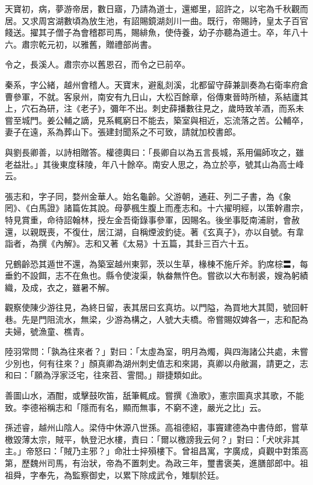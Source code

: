 \begin{pinyinscope}
 天寶初，病，夢游帝居，數日寤，乃請為道士，還鄉里，詔許之，以宅為千秋觀而居。又求周宮湖數頃為放生池，有詔賜鏡湖剡川一曲。既行，帝賜詩，皇太子百官餞送。擢其子僧子為會稽郡司馬，賜緋魚，使侍養，幼子亦聽為道士。卒，年八十六。肅宗乾元初，以雅舊，贈禮部尚書。



 令之，長溪人。肅宗亦以舊恩召，而令之已前卒。



 秦系，字公緒，越州會稽人。天寶末，避亂剡溪，北都留守薛兼訓奏為右衛率府倉曹參軍，不就。客泉州，南安有九日山，大松百餘章，俗傳東晉時所植，系結廬其上，穴石為研，注《老子》，彌年不出。刺史薛播數往見之，歲時致羊酒，而系未嘗至城門。姜公輔之謫，見系輒窮日不能去，築室與相近，忘流落之苦。公輔卒，妻子在遠，系為葬山下。張建封聞系之不可致，請就加校書郎。



 與劉長卿善，以詩相贈答。權德輿曰：「長卿自以為五言長城，系用偏師攻之，雖老益壯。」其後東度秣陵，年八十餘卒。南安人思之，為立於亭，號其山為高士峰云。



 張志和，字子同，婺州金華人。始名龜齡。父游朝，通莊、列二子書，為《象罔》、《白馬證》諸篇佐其說。母夢楓生腹上而產志和。十六擢明經，以策幹肅宗，特見賞重，命待詔翰林，授左金吾衛錄事參軍，因賜名。後坐事貶南浦尉，會赦還，以親既喪，不復仕，居江湖，自稱煙波釣徒。著《玄真子》，亦以自號。有韋詣者，為撰《內解》。志和又著《太易》十五篇，其卦三百六十五。



 兄鶴齡恐其遁世不還，為築室越州東郭，茨以生草，椽棟不施斤斧。豹席棕〓，每垂釣不設餌，志不在魚也。縣令使浚渠，執畚無忤色。嘗欲以大布制裘，嫂為躬績織，及成，衣之，雖暑不解。



 觀察使陳少游往見，為終日留，表其居曰玄真坊。以門隘，為買地大其閎，號回軒巷。先是門阻流水，無梁，少游為構之，人號大夫橋。帝嘗賜奴婢各一，志和配為夫婦，號漁童、樵青。



 陸羽常問：「孰為往來者？」對曰：「太虛為室，明月為燭，與四海諸公共處，未嘗少別也，何有往來？」顏真卿為湖州刺史值志和來謁，真卿以舟敝漏，請更之，志和曰：「願為浮家泛宅，往來苕、霅間。」辯捷類如此。



 善圖山水，酒酣，或擊鼓吹笛，舐筆輒成。嘗撰《漁歌》，憲宗圖真求其歌，不能致。李德裕稱志和「隱而有名，顯而無事，不窮不達，嚴光之比」云。



 孫述睿，越州山陰人。梁侍中休源八世孫。高祖德紹，事竇建德為中書侍郎，嘗草檄毀薄太宗，賊平，執登汜水樓，責曰：「爾以檄謗我云何？」對曰：「犬吠非其主。」帝怒曰：「賊乃主邪？」命壯士捽殞樓下。曾祖昌寓，字廣成，貞觀中對策高第，歷魏州司馬，有治狀，帝為不置刺史。為政三年，璽書褒美，進膳部郎中。祖祖舜，字奉先，為監察御史，以累下除成武令，雉馴於廷。




\end{pinyinscope}
